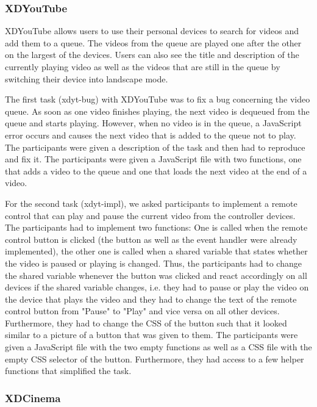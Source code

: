 \subsubsection{XDYouTube}
XDYouTube allows users to use their personal devices to search for videos and add them to a queue. The videos from the queue are played one after the other on the largest of the devices. Users can also see the title and description of the currently playing video as well as the videos that are still in the queue by switching their device into landscape mode.

The first task (xdyt-bug) with XDYouTube was to fix a bug concerning the video queue. As soon as one video finishes playing, the next video is dequeued from the queue and starts playing. However, when no video is in the queue, a JavaScript error occurs and causes the next video that is added to the queue not to play. The participants were given a description of the task and then had to reproduce and fix it.  The participants were given a JavaScript file with two functions, one that adds a video to the queue and one that loads the next video at the end of a video.

For the second task (xdyt-impl), we asked participants to implement a remote control that can play and pause the current video from the controller devices. The participants had to implement two functions: One is called when the remote control button is clicked (the button as well as the event handler were already implemented), the other one is called when a shared variable that states whether the video is paused or playing is changed. Thus, the participants had to change the shared variable whenever the button was clicked and react accordingly on all devices if the shared variable changes, i.e. they had to pause or play the video on the device that plays the video and they had to change the text of the remote control button from "Pause" to "Play" and vice versa on all other devices. Furthermore, they had to change the CSS of the button such that it looked similar to a picture of a button that was given to them. The participants were given a JavaScript file with the two empty functions as well as a CSS file with the empty CSS selector of the button. Furthermore, they had access to a few helper functions that simplified the task.

\subsubsection{XDCinema}

